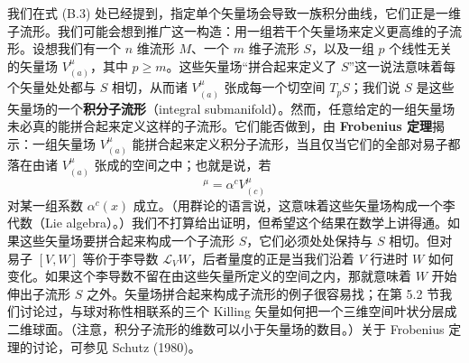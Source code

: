 我们在式 (B.3) 处已经提到，指定单个矢量场会导致一族积分曲线，它们正是一维子流形。我们可能会想到推广这一构造：用一组若干个矢量场来定义更高维的子流形。设想我们有一个 $n$ 维流形 $M$、一个 $m$ 维子流形 $S$，以及一组 $p$ 个线性无关的矢量场 $V^\mu_{(a)}$，其中 $p \geq m$。这些矢量场“拼合起来定义了 $S$”这一说法意味着每个矢量处处都与 $S$ 相切，从而诸 $V^\mu_{(a)}$ 张成每一个切空间 $T_pS$；我们说 $S$ 是这些矢量场的一个\textbf{积分子流形}（integral submanifold）。然而，任意给定的一组矢量场未必真的能拼合起来定义这样的子流形。它们能否做到，由 \textbf{Frobenius 定理}揭示：一组矢量场 $V^\mu_{(a)}$ 能拼合起来定义积分子流形，当且仅当它们的全部对易子都落在由诸 $V^\mu_{(a)}$ 张成的空间之中；也就是说，若
\begin{equation*}
[V_{(a)}, V_{(b)}]^\mu = \alpha^c V^\mu_{(c)}
\tag{C.3}
\end{equation*}
对某一组系数 $\alpha^c(x)$ 成立。（用群论的语言说，这意味着这些矢量场构成一个李代数（Lie algebra）。）我们不打算给出证明，但希望这个结果在数学上讲得通。如果这些矢量场要拼合起来构成一个子流形 $S$，它们必须处处保持与 $S$ 相切。但对易子 $[V, W]$ 等价于李导数 $\mathcal{L}_V W$，后者量度的正是当我们沿着 $V$ 行进时 $W$ 如何变化。如果这个李导数不留在由这些矢量所定义的空间之内，那就意味着 $W$ 开始伸出子流形 $S$ 之外。矢量场拼合起来构成子流形的例子很容易找；在第 5.2 节我们讨论过，与球对称性相联系的三个 Killing 矢量如何把一个三维空间叶状分层成二维球面。（注意，积分子流形的维数可以小于矢量场的数目。）关于 Frobenius 定理的讨论，可参见 Schutz (1980)。

